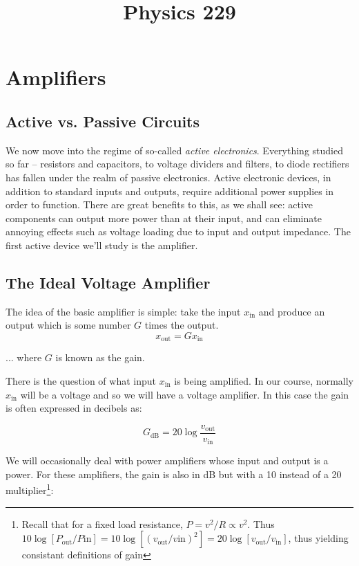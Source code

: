 \documentclass[]{article}
\title{Physics 229}
\begin{document}
\section{Amplifiers}
\subsection{Active vs. Passive Circuits}
We now move into the regime of so-called \textit{active electronics}. Everything studied so far -- resistors and capacitors, to voltage dividers and filters, to diode rectifiers has fallen under the realm of passive electronics. Active electronic devices, in addition to standard inputs and outputs, require additional power supplies in order to function. There are great benefits to this, as we shall see: active components can output more power than at their input, and can eliminate annoying effects such as voltage loading due to input and output impedance. The first active device we'll study is the amplifier.
\subsection{The Ideal Voltage Amplifier}
The idea of the basic amplifier is simple: take the input $x_\text{in}$ and produce an output which is some number $G$ times the output.
\begin{equation}
\label{eq:simple_amp}
x_\text{out} = Gx_\text{in}
\end{equation}

\noindent ... where $G$ is known as the gain.

There is the question of what input $x_\text{in}$ is being amplified. In our course, normally $x_\text{in}$ will be a voltage and so we will have a voltage amplifier. In this case the gain is often expressed in decibels as:

\begin{equation}
\label{eq:voltage_amp_dB}
G_\text{dB} = 20\log\frac{v_\text{out}}{v_\text{in}} 
\end{equation}

We will occasionally deal with power amplifiers whose input and output is a power. For these amplifiers, the gain is also in dB but with a 10 instead of a 20 multiplier\footnote{Recall that for a fixed load resistance, $P = v^2/R \propto v^2$. Thus $10\log\left[P_\text{out}/P\text{in}\right] = 10\log\left[\left(v_\text{out}/v\text{in}\right)^2\right] = 20\log\left[v_\text{out}/v_\text{in}\right]$, thus yielding consistant definitions of gain}:
\end{document}
